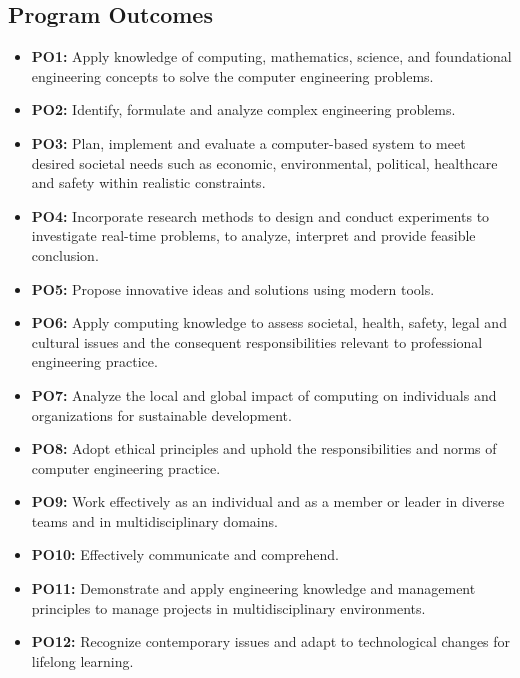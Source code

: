 \documentclass[12pt, a4paper]{extarticle}
\begin{document}
    \subsection{Program Outcomes}
    	\begin{itemize}
    		\item[]\textbf{PO1:} Apply knowledge of computing, mathematics, science, and foundational engineering concepts to solve the computer engineering problems.
    		\item[]\textbf{PO2:} Identify, formulate and analyze complex engineering problems.
    		\item[]\textbf{PO3:} Plan, implement and evaluate a computer-based system to meet desired societal needs such as economic, environmental, political, healthcare and safety within realistic constraints.
    		\item[]\textbf{PO4:} Incorporate research methods to design and conduct experiments to investigate real-time problems, to analyze, interpret and provide feasible conclusion.
    		\item[]\textbf{PO5:} Propose innovative ideas and solutions using modern tools.
    		\item[]\textbf{PO6:} Apply computing knowledge to assess societal, health, safety, legal and cultural issues and the consequent responsibilities relevant to professional engineering practice.
    		\item[]\textbf{PO7:} Analyze the local and global impact of computing on individuals and organizations for sustainable development.
    		\item[]\textbf{PO8:} Adopt ethical principles and uphold the responsibilities and norms of computer engineering practice.
    		\item[]\textbf{PO9:} Work effectively as an individual and as a member or leader in diverse teams and in multidisciplinary domains.
    		\item[]\textbf{PO10:} Effectively communicate and comprehend.
    		\item[]\textbf{PO11:} Demonstrate and apply engineering knowledge and management principles to manage projects in multidisciplinary environments.
    		\item[]\textbf{PO12:} Recognize contemporary issues and adapt to technological changes for lifelong learning.
    	\end{itemize}
\end{document}
